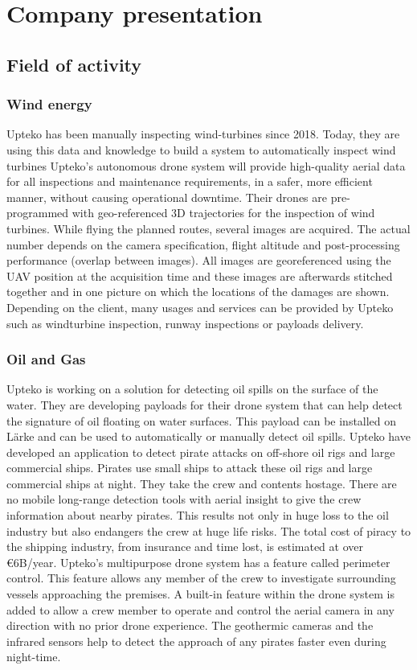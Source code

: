\chapter{Company presentation}

\section{Field of activity}
\subsection{Wind energy}
Upteko has been manually inspecting wind-turbines since 2018. Today, they are using this data and knowledge to build a system to automatically inspect wind turbines
Upteko's autonomous drone system will provide high-quality aerial data for all inspections and maintenance requirements, in a safer, more efficient manner, without causing operational downtime.
Their drones are pre-programmed with geo-referenced 3D trajectories for the inspection of wind turbines. While flying the planned routes, several images are acquired. The actual number depends on the camera specification, flight altitude and post-processing performance (overlap between images). All images are georeferenced using the UAV position at the acquisition time and these images are afterwards stitched together and in one picture on which the locations of the damages are shown.
Depending on the client, many usages and services can be provided by Upteko such as windturbine inspection, runway inspections or payloads delivery.

\subsection{Oil and Gas}
Upteko is working on a solution for detecting oil spills on the surface of the water. They are developing payloads for their drone system that can help detect the signature of oil floating on water surfaces. This payload can be installed on Lärke and can be used to automatically or manually detect oil spills.
Upteko have developed an application to detect pirate attacks on off-shore oil rigs and large commercial ships. Pirates use small ships to attack these oil rigs and large commercial ships at night. They take the crew and contents hostage. There are no mobile long-range detection tools with aerial insight to give the crew information about nearby pirates. This results not only in huge loss to the oil industry but also endangers the crew at huge life risks.
The total cost of piracy to the shipping industry, from insurance and time lost, is estimated at over €6B/year.
Upteko's multipurpose drone system has a feature called perimeter control. This feature allows any member of the crew to investigate surrounding vessels approaching the premises. A built-in feature within the drone system is added to allow a crew member to operate and control the aerial camera in any direction with no prior drone experience. The geothermic cameras and the infrared sensors help to detect the approach of any pirates faster even during night-time.

